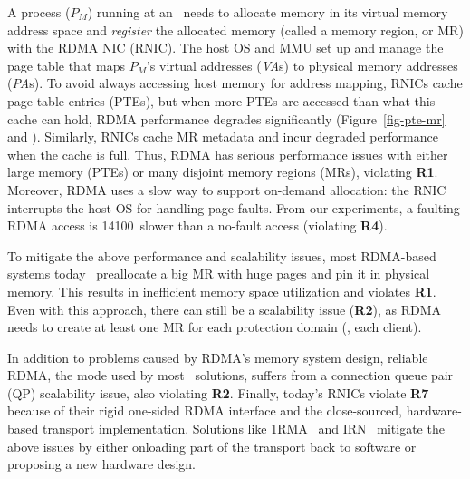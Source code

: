 A process ($P_M$) running at an \MN\ needs to allocate memory in its virtual memory address space 
and {\em register} the allocated memory (called a memory region, or MR) with the RDMA NIC (RNIC).
The host OS and MMU set up and manage the page table that maps $P_M$'s virtual addresses ({\em VA}s) to physical memory addresses ({\em PA}s).
To avoid always accessing host memory for address mapping, RNICs cache page table entries (PTEs),
but when more PTEs are accessed than what this cache can hold, RDMA performance degrades significantly (Figure~\ref{fig-pte-mr} and \cite{FaRM,Tsai17-SOSP}).
Similarly, RNICs cache MR metadata and incur degraded performance when the cache is full. 
Thus, RDMA has serious performance issues with either large memory (PTEs) or many disjoint memory regions (MRs), violating \textbf{R1}.
Moreover, RDMA uses a slow way to support on-demand allocation: the RNIC interrupts the host OS for handling page faults.
From our experiments, a faulting RDMA access is 14100\x\ slower than a no-fault access (violating \textbf{R4}).

To mitigate the above performance and scalability issues, most RDMA-based systems today~\cite{FaRM,Tsai17-SOSP} 
preallocate a big MR with huge pages and pin it in physical memory.
This results in inefficient memory space utilization and violates \textbf{R1}.
Even with this approach, there can still be a scalability issue (\textbf{R2}),
as RDMA needs to create at least one MR for each protection domain (\ie, each client).

In addition to problems caused by RDMA's memory system design, reliable RDMA, the mode used by most \md\ solutions, suffers from a connection queue pair (QP) scalability issue, also violating \textbf{R2}.
Finally, today's RNICs violate \textbf{R7} because of their rigid one-sided RDMA interface and the close-sourced, hardware-based transport implementation.
Solutions like 1RMA~\cite{1RMA} and IRN~\cite{IRN} mitigate the above issues by either onloading part of the transport back to software or proposing a new hardware design.

